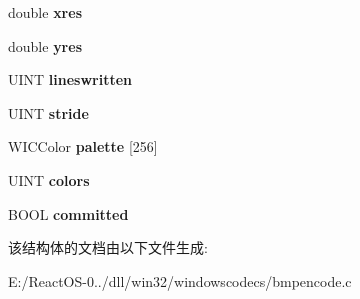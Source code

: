 \begin{DoxyCompactItemize}
\mbox{\label{struct_bmp_frame_encode_ad176d748513e9653fd305b952dbb3a80}} 
double {\bfseries xres}
\item 
\mbox{\label{struct_bmp_frame_encode_a8148a3027a852a9298dedc014cdf9139}} 
double {\bfseries yres}
\item 
\mbox{\label{struct_bmp_frame_encode_a00a2480258fb5fc15c1d2ba9e33dbb53}} 
U\+I\+NT {\bfseries lineswritten}
\item 
\mbox{\label{struct_bmp_frame_encode_a148831aadc2c42ad8181283bd5600b11}} 
U\+I\+NT {\bfseries stride}
\item 
\mbox{\label{struct_bmp_frame_encode_a4cb665524544509c67c95a7f9d8c8d9b}} 
W\+I\+C\+Color {\bfseries palette} \mbox{[}256\mbox{]}
\item 
\mbox{\label{struct_bmp_frame_encode_a1ef74c214a625b985d5b8cddeb1999d0}} 
U\+I\+NT {\bfseries colors}
\item 
\mbox{\label{struct_bmp_frame_encode_a1ee74ef76f82990aa761c699f9610143}} 
B\+O\+OL {\bfseries committed}
\end{DoxyCompactItemize}


该结构体的文档由以下文件生成\+:\begin{DoxyCompactItemize}
\item 
E\+:/\+React\+O\+S-\/0../dll/win32/windowscodecs/bmpencode.\+c\end{DoxyCompactItemize}
